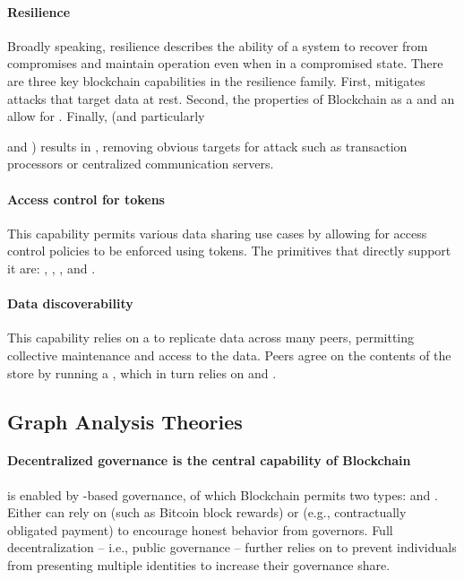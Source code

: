 \paragraph{Resilience} Broadly speaking, resilience describes the ability of a system to recover from compromises and maintain operation even when in a compromised state. There are three key blockchain capabilities in the resilience family. First,  mitigates attacks that target data at rest. Second, the properties of Blockchain as a  and an  allow for . Finally,  (and particularly { and ) results in , removing obvious targets for attack such as transaction processors or centralized communication servers.

\paragraph{Access control for tokens} This capability permits various data sharing use cases by allowing for access control policies to be enforced using tokens. The primitives that directly support it are: , , , and .

\paragraph{Data discoverability} This capability relies on a  to replicate data across many peers, permitting collective maintenance and access to the data. Peers agree on the contents of the store by running a , which in turn relies on  and . 

\subsection{Graph Analysis Theories}

\paragraph{Decentralized governance is the central capability of Blockchain}
 is enabled by -based governance, of which Blockchain permits two types:  and . Either can rely on  (such as Bitcoin block rewards) or  (e.g., contractually obligated payment) to encourage honest behavior from governors. Full decentralization -- i.e., public governance -- further relies on  to prevent individuals from presenting multiple identities to increase their governance share.

}
